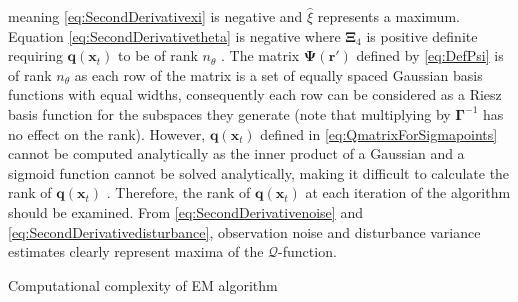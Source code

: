 \documentclass[]{article}
\begin{document}
meaning \eqref{eq:SecondDerivativexi} is negative and $\hat{\xi}$ represents a maximum. Equation \eqref{eq:SecondDerivativetheta} is negative where $\boldsymbol\Xi_4$ is positive definite requiring $\mathbf q(\mathbf x_t)$ to be of  rank $n_{\theta}$ \cite{Golub1996}. The matrix $\boldsymbol\Psi(\mathbf r')$ defined by \eqref{eq:DefPsi} is of rank $n_{\theta}$ as each row of the matrix is a set of equally spaced Gaussian basis functions with equal widths, consequently each row can be considered as a Riesz basis function for the subspaces they generate \cite{Ferrari2004} (note that multiplying by $\mathbf \Gamma^{-1}$ has no effect on the rank). However, $\mathbf q(\mathbf x_t)$ defined in \eqref{eq:QmatrixForSigmapoints} cannot be computed analytically as the inner product of a Gaussian and a sigmoid function cannot be solved analytically, making it difficult to calculate the rank of $\mathbf q(\mathbf x_t)$ . Therefore, the rank of $\mathbf q(\mathbf x_t)$ at each iteration of the algorithm should be examined. From \eqref{eq:SecondDerivativenoise} and \eqref{eq:SecondDerivativedisturbance}, observation noise and disturbance variance estimates clearly represent maxima of the $\mathcal{Q}$-function. 
 \begin {table}
\begin{center}
 \caption {Computational complexity of EM algorithm} 
\label{table:ComputationalComplexity}
\end{center}
\end {table}
\end{document}

